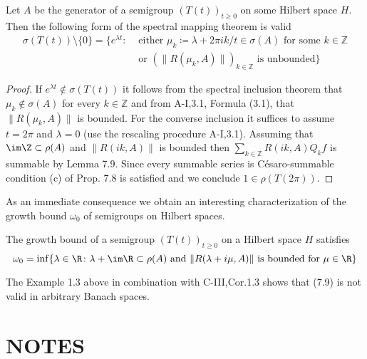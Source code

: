 \begin{theorem}\label{thm:a3-7.10}
Let $A$ be the generator of a semigroup $(T(t))_{t\geq 0}$ on some Hilbert space $H$.
Then the following form of the spectral mapping theorem is valid
\begin{align*}
\sigma(T(t))\setminus\{0\} = \{e^{\lambda t} \colon
& \text{ either } \mu_{k}\coloneqq \lambda + 2\pi i k/t \in \sigma(A) \text{ for some } k \in \mathbb{Z}\\
& \text{ or } (\|R(\mu_{k},A)\|)_{k\in\mathbb{Z}} \text{ is unbounded}\}
\end{align*}
\end{theorem}

\begin{proof}
If $e^{\lambda t} \not\in \sigma(T(t))$ it follows from the spectral inclusion theorem that $\mu_{k} \not\in \sigma(A)$ for every $k \in \mathbb{Z}$ and from A-I,3.1, Formula (3.1), that $\|R(\mu_{k},A)\|$ is bounded.
For the converse inclusion it suffices to assume $t = 2\pi$ and $\lambda = 0$ (use the rescaling procedure A-I,3.1).
Assuming that $\im\Z \subset \rho(A)$ and $\|R(ik,A)\|$ is bounded then $\sum_{k\in\mathbb{Z}} R(ik,A)Q_{k}f$ is summable by Lemma 7.9.
Since every summable series is Césaro-summable condition (c) of Prop. 7.8 is satisfied and we conclude $1 \in \rho(T(2\pi))$.
\end{proof}

As an immediate consequence we obtain an interesting characterization of the growth bound $\omega_{0}$ of semigroups on Hilbert spaces.

\begin{corollary}\label{cor:a3-7.11}
The growth bound of a semigroup $(T(t))_{t\geq 0}$ on a Hilbert space $H$ satisfies
\begin{equation}\label{eq:a3-7.9}
\omega_{0} = \inf \{\lambda \in \R \colon \lambda + \im\R \subset \rho(A) \text{ and } \|R(\lambda+i\mu,A)\| \text{ is bounded for } \mu \in \R\}
\end{equation}
\end{corollary}

The Example 1.3 above in combination with C-III,Cor.1.3 shows that (7.9) is not valid in arbitrary Banach spaces.

\section*{NOTES}

